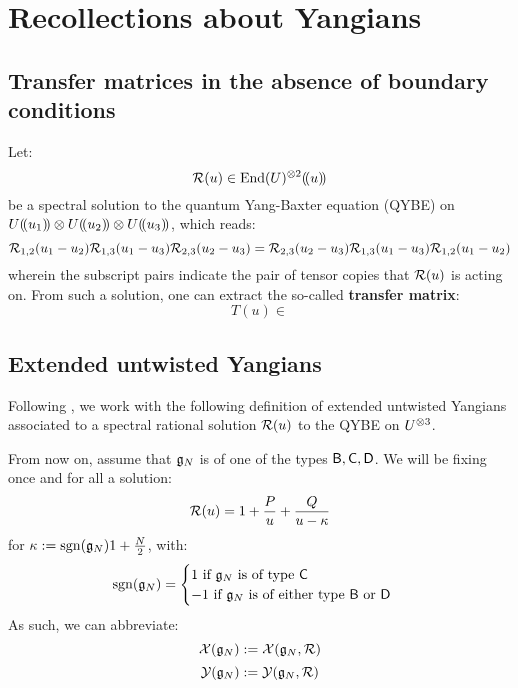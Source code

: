     \section{Recollections about Yangians}
        \subsection{Transfer matrices in the absence of boundary conditions}
            Let:
                $$\calR(u) \in \End(U)^{\tensor 2}(\!(u)\!)$$
            be a spectral solution to the quantum Yang-Baxter equation (QYBE) on $U(\!(u_1)\!) \tensor U(\!(u_2)\!) \tensor U(\!(u_3)\!)$, which reads:
                \begin{equation} \label{equation: QYBE}
                    \mathcal{R}_{1, 2}(u_1 - u_2) \mathcal{R}_{1, 3}(u_1 - u_3) \mathcal{R}_{2, 3}(u_2 - u_3) = \mathcal{R}_{2, 3}(u_2 - u_3) \mathcal{R}_{1, 3}(u_1 - u_3) \mathcal{R}_{1, 2}(u_1 - u_2)
                \end{equation}
            wherein the subscript pairs indicate the pair of tensor copies that $\mathcal{R}(u)$ is acting on. From such a solution, one can extract the so-called \textbf{transfer matrix}:
                $$T(u) \in $$

        \subsection{Extended untwisted Yangians}
            Following \cite[Definition 2.1]{guay_regelskis_twisted_yangians_for_symmetric_pairs_of_types_BCD}, we work with the following definition of extended untwisted Yangians associated to a spectral rational solution $\mathcal{R}(u)$ to the QYBE on $U^{\tensor 3}$.
            \begin{definition} \label{def: (extended)_untwisted_yangians}
                
            \end{definition}

            From now on, assume that $\mathfrak{g}_N$ is of one of the types $\mathsf{B}, \mathsf{C}, \mathsf{D}$. We will be fixing once and for all a solution:
                $$\mathcal{R}(u) = 1 + \frac{P}{u} + \frac{Q}{u - \kappa}$$
            for $\kappa := \operatorname{sgn}(\mathfrak{g}_N) 1 + \frac{N}{2}$, with:
                \begin{equation} \label{equation: BCD_signature}
                    \operatorname{sgn}(\mathfrak{g}_N) =
                    \begin{cases}
                        \text{$1$ if $\mathfrak{g}_N$ is of type $\mathsf{C}$}
                        \\
                        \text{$-1$ if $\mathfrak{g}_N$ is of either type $\mathsf{B}$ or $\mathsf{D}$}
                    \end{cases}
                \end{equation}
            As such, we can abbreviate:
                $$\mathcal{X}(\mathfrak{g}_N) := \mathcal{X}(\mathfrak{g}_N, \mathcal{R})$$
                $$\mathcal{Y}(\mathfrak{g}_N) := \mathcal{Y}(\mathfrak{g}_N, \mathcal{R})$$

